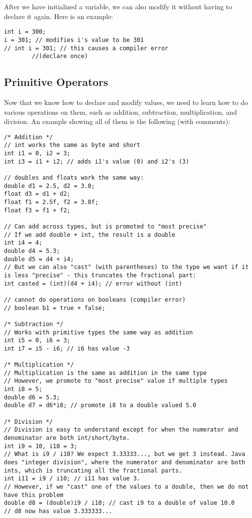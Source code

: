 \noindent After we have initialized a variable, we can also modify it without having to declare it again. Here is an example:
\begin{lstlisting}
int i = 300;
i = 301; // modifies i's value to be 301
// int i = 301; // this causes a compiler error 
		//(declare once)
\end{lstlisting}

\subsection{Primitive Operators}
Now that we know how to declare and modify values, we need to learn how to do various operations on them, such as addition, subtraction, multiplication, and division. An example showing all of them is the following (with comments):
\begin{lstlisting}
/* Addition */
// int works the same as byte and short
int i1 = 0, i2 = 3;
int i3 = i1 + i2; // adds i1's value (0) and i2's (3)

// doubles and floats work the same way:
double d1 = 2.5, d2 = 3.0;
float d3 = d1 + d2;
float f1 = 2.5f, f2 = 3.0f;
float f3 = f1 + f2;

// Can add across types, but is promoted to "most precise"
// If we add double + int, the result is a double
int i4 = 4;
double d4 = 5.3;
double d5 = d4 + i4;
// But we can also "cast" (with parentheses) to the type we want if it is less "precise" - this truncates the fractional part:
int casted = (int)(d4 + i4); // error without (int)

// cannot do operations on booleans (compiler error)
// boolean b1 = true + false;

/* Subtraction */
// Works with primitive types the same way as addition
int i5 = 0, i6 = 3;
int i7 = i5 - i6; // i6 has value -3

/* Multiplication */
// Multiplication is the same as addition in the same type
// However, we promote to "most precise" value if multiple types
int i8 = 5;
double d6 = 5.3;
double d7 = d6*i8; // promote i8 to a double valued 5.0

/* Division */
// Division is easy to understand except for when the numerator and denominator are both int/short/byte.
int i9 = 10, i10 = 3;
// What is i9 / i10? We expect 3.33333..., but we get 3 instead. Java does "integer division", where the numerator and denominator are both ints, which is truncating all the fractional parts.
int i11 = i9 / i10; // i11 has value 3.
// However, if we "cast" one of the values to a double, then we do not have this problem
double d8 = (double)i9 / i10; // cast i9 to a double of value 10.0
// d8 now has value 3.333333...
\end{lstlisting}

